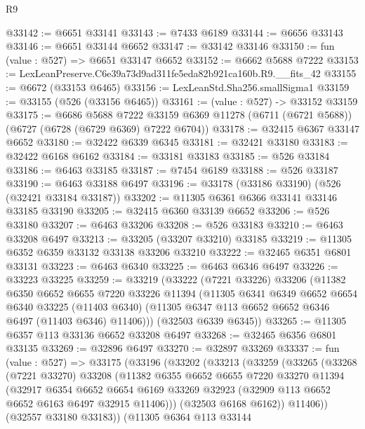 \begin{lexlean}{R9}
\begin{coremodule}
@33142 := @6651 @33141
@33143 := @7433 @6189
@33144 := @6656 @33143
@33146 := @6651 @33144 @6652
@33147 := @33142 @33146
@33150 := fun (value : @527) => @6651 @33147 @6652
@33152 := @6662 @5688 @7222
@33153 := LexLeanPreserve.C6e39a73d9ad311fe5eda82b921ca160b.R9.__fits_42
@33155 := @6672 (@33153 @6465)
@33156 := LexLeanStd.Sha256.smallSigma1
@33159 := @33155 (@526 (@33156 @6465))
@33161 := (value : @527) -> @33152 @33159
@33175 := @6686
    @5688
    @7222
    @33159
    @6369
    @11278
    (@6711 (@6721 @5688))
    (@6727 (@6728 (@6729 @6369) @7222 @6704))
@33178 := @32415 @6367 @33147 @6652
@33180 := @32422 @6339 @6345
@33181 := @32421 @33180
@33183 := @32422 @6168 @6162
@33184 := @33181 @33183
@33185 := @526 @33184
@33186 := @6463 @33185
@33187 := @7454 @6189
@33188 := @526 @33187
@33190 := @6463 @33188 @6497
@33196 := @33178 (@33186 @33190) (@526 (@32421 @33184 @33187))
@33202 := @11305 @6361 @6366 @33141 @33146 @33185 @33190
@33205 := @32415 @6360 @33139 @6652
@33206 := @526 @33180
@33207 := @6463 @33206
@33208 := @526 @33183
@33210 := @6463 @33208 @6497
@33213 := @33205 (@33207 @33210) @33185
@33219 := @11305 @6352 @6359 @33132 @33138 @33206 @33210
@33222 := @32465 @6351 @6801 @33131
@33223 := @6463 @6340
@33225 := @6463 @6346 @6497
@33226 := @33223 @33225
@33259 := @33219
    (@33222
      (@7221 @33226)
      @33206
      (@11382
        @6350
        @6652
        @6655
        @7220
        @33226
        @11394
        (@11305
          @6341
          @6349
          @6652
          @6654
          @6340
          @33225
          (@11403 @6340)
          (@11305 @6347 @113 @6652 @6652 @6346 @6497 (@11403 @6346) @11406)))
      (@32503 @6339 @6345))
@33265 := @11305 @6357 @113 @33136 @6652 @33208 @6497
@33268 := @32465 @6356 @6801 @33135
@33269 := @32896 @6497
@33270 := @32897 @33269
@33337 := fun (value : @527) =>
  @33175
    (@33196
      (@33202
        (@33213
          (@33259
            (@33265
              (@33268
                (@7221 @33270)
                @33208
                (@11382
                  @6355
                  @6652
                  @6655
                  @7220
                  @33270
                  @11394
                  (@32917
                    @6354
                    @6652
                    @6654
                    @6169
                    @33269
                    @32923
                    (@32909 @113 @6652 @6652 @6163 @6497 @32915 @11406)))
                (@32503 @6168 @6162))
              @11406))
          (@32557 @33180 @33183))
        (@11305
          @6364
          @113
          @33144

\end{coremodule}
\end{lexlean}
